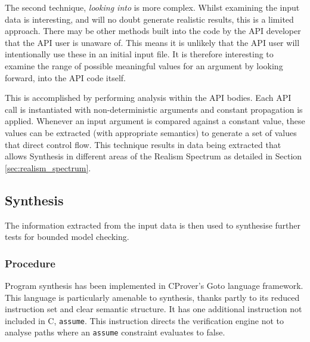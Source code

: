\documentclass[EPiCempty]{easychair}
\begin{document}
The second technique, \emph{looking into} is more complex.  Whilst examining the input data is interesting, and will no doubt generate realistic results, this is a limited approach.  There may be other methods built into the code by the API developer that the API user is unaware of.  This means it is unlikely that the API user will intentionally use these in an initial input file.  It is therefore interesting to examine the range of possible meaningful values for an argument by looking forward, into the API code itself.

This is accomplished by performing analysis within the API bodies.  Each API call is instantiated with non-deterministic arguments and constant propagation is applied.  Whenever an input argument is compared against a constant value, these values can be extracted (with appropriate semantics) to generate a set of values that direct control flow.   This technique results in data being extracted that allows Synthesis in different areas of the Realism Spectrum as detailed in Section \ref{sec:realism_spectrum}.

\subsection{Synthesis}
\label{sec:synthesis}
The information extracted from the input data is then used to synthesise further tests for bounded model checking.  


\subsubsection{Procedure}

Program synthesis has been implemented in CProver's Goto language  framework. This language is particularly amenable to synthesis, thanks partly to its reduced instruction set and clear semantic structure.  It has one additional instruction not included in C, \texttt{assume}.  This instruction directs the verification engine not to analyse paths where an \texttt{assume} constraint evaluates to false.
\end{document}
